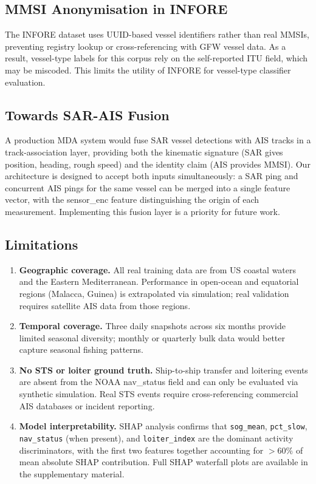 \documentclass[journal]{IEEEtran}
\begin{document}
\subsection{MMSI Anonymisation in INFORE}

The INFORE dataset uses UUID-based vessel identifiers rather than real
MMSIs, preventing registry lookup or cross-referencing with GFW vessel
data. As a result, vessel-type labels for this corpus rely on the
self-reported ITU field, which may be miscoded. This limits the utility
of INFORE for vessel-type classifier evaluation.

\subsection{Towards SAR-AIS Fusion}

A production MDA system would fuse SAR vessel detections with AIS tracks
in a track-association layer, providing both the kinematic signature (SAR
gives position, heading, rough speed) and the identity claim (AIS provides
MMSI). Our architecture is designed to accept both inputs simultaneously:
a SAR ping and concurrent AIS pings for the same vessel can be merged into
a single feature vector, with the sensor\_enc feature distinguishing the
origin of each measurement. Implementing this fusion layer is a priority
for future work.

\subsection{Limitations}

\begin{enumerate}
  \item \textbf{Geographic coverage.} All real training data are from
        US coastal waters and the Eastern Mediterranean. Performance in
        open-ocean and equatorial regions (Malacca, Guinea) is extrapolated
        via simulation; real validation requires satellite AIS data from
        those regions.

  \item \textbf{Temporal coverage.} Three daily snapshots across
        six months provide limited seasonal diversity; monthly or
        quarterly bulk data would better capture seasonal fishing patterns.

  \item \textbf{No STS or loiter ground truth.} Ship-to-ship transfer
        and loitering events are absent from the NOAA nav\_status field
        and can only be evaluated via synthetic simulation. Real STS events
        require cross-referencing commercial AIS databases or incident
        reporting.

  \item \textbf{Model interpretability.} SHAP analysis confirms that
        \texttt{sog\_mean}, \texttt{pct\_slow}, \texttt{nav\_status}
        (when present), and \texttt{loiter\_index} are the dominant
        activity discriminators, with the first two features together
        accounting for $>60\%$ of mean absolute SHAP contribution.
        Full SHAP waterfall plots are available in the supplementary
        material.
\end{enumerate}
\end{document}
